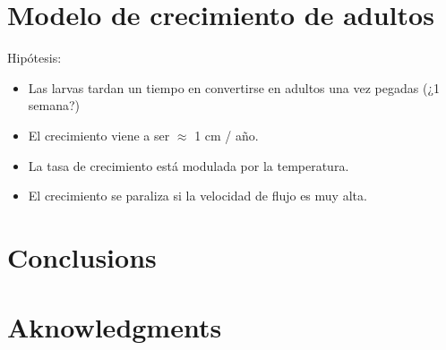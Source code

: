 \documentclass[review,authoryear]{elsarticle}
\begin{document}
\clearpage
\section{Modelo de crecimiento de adultos}

Hipótesis:
\begin{itemize}
\item Las larvas tardan un tiempo en convertirse en adultos una vez pegadas
(¿1 semana?)
\item El crecimiento viene a ser $\approx$ 1 cm / año.
\item La tasa de crecimiento está modulada por la temperatura.
\item El crecimiento se paraliza si la velocidad de flujo es muy alta.
\end{itemize}

\section{Conclusions}

\section*{Aknowledgments}



\end{document}
